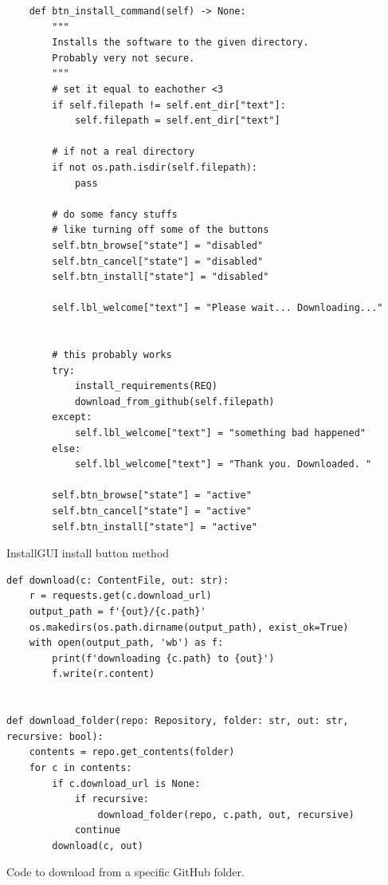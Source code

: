 \documentclass[11pt]{article}
\begin{document}
        \newpage
        \begin{listing}[!ht]
            \begin{verbatim}
    def btn_install_command(self) -> None:
        """ 
        Installs the software to the given directory. 
        Probably very not secure. 
        """
        # set it equal to eachother <3
        if self.filepath != self.ent_dir["text"]:
            self.filepath = self.ent_dir["text"]
            
        # if not a real directory
        if not os.path.isdir(self.filepath):
            pass
        
        # do some fancy stuffs
        # like turning off some of the buttons
        self.btn_browse["state"] = "disabled"
        self.btn_cancel["state"] = "disabled"
        self.btn_install["state"] = "disabled"
        
        self.lbl_welcome["text"] = "Please wait... Downloading..."
        
        
        # this probably works
        try:
            install_requirements(REQ)
            download_from_github(self.filepath)
        except:
            self.lbl_welcome["text"] = "something bad happened"
        else:
            self.lbl_welcome["text"] = "Thank you. Downloaded. "
        
        self.btn_browse["state"] = "active"
        self.btn_cancel["state"] = "active"
        self.btn_install["state"] = "active"
            \end{verbatim}
            \caption{InstallGUI install button method}
            \label{sc:install_btn_sc_c1}
        \end{listing}


        \newpage
        \begin{listing}[!ht]
            \begin{verbatim}
def download(c: ContentFile, out: str):
    r = requests.get(c.download_url)
    output_path = f'{out}/{c.path}'
    os.makedirs(os.path.dirname(output_path), exist_ok=True)
    with open(output_path, 'wb') as f:
        print(f'downloading {c.path} to {out}')
        f.write(r.content)


def download_folder(repo: Repository, folder: str, out: str, recursive: bool):
    contents = repo.get_contents(folder)
    for c in contents:
        if c.download_url is None:
            if recursive:
                download_folder(repo, c.path, out, recursive)
            continue
        download(c, out)
            \end{verbatim}
            \caption{Code to download from a specific GitHub folder.}
            \label{sc:dl_from_github_stolen_c1}
        \end{listing}
\end{document}
